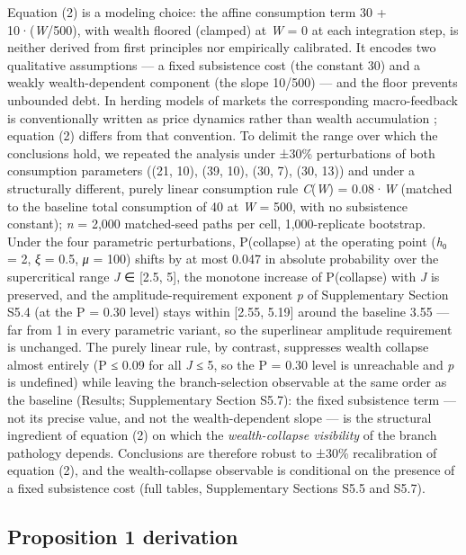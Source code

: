 \documentclass[11pt,letterpaper]{article}
\begin{document}
Equation (2) is a modeling choice: the affine consumption term 30 + 10·(\emph{W}/500), with wealth floored (clamped) at \emph{W} = 0 at each integration step, is neither derived from first principles nor empirically calibrated. It encodes two qualitative assumptions --- a fixed subsistence cost (the constant 30) and a weakly wealth-dependent component (the slope 10/500) --- and the floor prevents unbounded debt. In herding models of markets the corresponding macro-feedback is conventionally written as price dynamics rather than wealth accumulation \cite{lux1995,contbouchaud2000}; equation (2) differs from that convention. To delimit the range over which the conclusions hold, we repeated the analysis under ±30\% perturbations of both consumption parameters ((21, 10), (39, 10), (30, 7), (30, 13)) and under a structurally different, purely linear consumption rule \emph{C}(\emph{W}) = 0.08·\emph{W} (matched to the baseline total consumption of 40 at \emph{W} = 500, with no subsistence constant); \emph{n} = 2,000 matched-seed paths per cell, 1,000-replicate bootstrap. Under the four parametric perturbations, P(collapse) at the operating point (\emph{h}₀ = 2, \emph{ξ} = 0.5, \emph{μ} = 100) shifts by at most 0.047 in absolute probability over the supercritical range \emph{J} ∈ {[}2.5, 5{]}, the monotone increase of P(collapse) with \emph{J} is preserved, and the amplitude-requirement exponent \emph{p} of Supplementary Section S5.4 (at the P = 0.30 level) stays within {[}2.55, 5.19{]} around the baseline 3.55 --- far from 1 in every parametric variant, so the superlinear amplitude requirement is unchanged. The purely linear rule, by contrast, suppresses wealth collapse almost entirely (P ≤ 0.09 for all \emph{J} ≤ 5, so the P = 0.30 level is unreachable and \emph{p} is undefined) while leaving the branch-selection observable at the same order as the baseline (Results; Supplementary Section S5.7): the fixed subsistence term --- not its precise value, and not the wealth-dependent slope --- is the structural ingredient of equation (2) on which the \emph{wealth-collapse visibility} of the branch pathology depends. Conclusions are therefore robust to ±30\% recalibration of equation (2), and the wealth-collapse observable is conditional on the presence of a fixed subsistence cost (full tables, Supplementary Sections S5.5 and S5.7).

\subsection{Proposition 1 derivation}\label{proposition-1-derivation}
\end{document}
